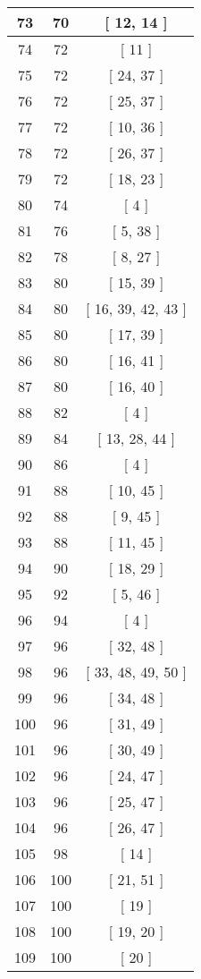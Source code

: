 \begin{center}
\begin{longtable}[H]{|| c c c ||}
73 & 70 & [ 12, 14 ] \\ 
\hline
74 & 72 & [ 11 ] \\ 
\hline
75 & 72 & [ 24, 37 ] \\ 
\hline
76 & 72 & [ 25, 37 ] \\ 
\hline
77 & 72 & [ 10, 36 ] \\ 
\hline
78 & 72 & [ 26, 37 ] \\ 
\hline
79 & 72 & [ 18, 23 ] \\ 
\hline
80 & 74 & [ 4 ] \\ 
\hline
81 & 76 & [ 5, 38 ] \\ 
\hline
82 & 78 & [ 8, 27 ] \\ 
\hline
83 & 80 & [ 15, 39 ] \\ 
\hline
84 & 80 & [ 16, 39, 42, 43 ] \\ 
\hline
85 & 80 & [ 17, 39 ] \\ 
\hline
86 & 80 & [ 16, 41 ] \\ 
\hline
87 & 80 & [ 16, 40 ] \\ 
\hline
88 & 82 & [ 4 ] \\ 
\hline
89 & 84 & [ 13, 28, 44 ] \\ 
\hline
90 & 86 & [ 4 ] \\ 
\hline
91 & 88 & [ 10, 45 ] \\ 
\hline
92 & 88 & [ 9, 45 ] \\ 
\hline
93 & 88 & [ 11, 45 ] \\ 
\hline
94 & 90 & [ 18, 29 ] \\ 
\hline
95 & 92 & [ 5, 46 ] \\ 
\hline
96 & 94 & [ 4 ] \\ 
\hline
97 & 96 & [ 32, 48 ] \\ 
\hline
98 & 96 & [ 33, 48, 49, 50 ] \\ 
\hline
99 & 96 & [ 34, 48 ] \\ 
\hline
100 & 96 & [ 31, 49 ] \\ 
\hline
101 & 96 & [ 30, 49 ] \\ 
\hline
102 & 96 & [ 24, 47 ] \\ 
\hline
103 & 96 & [ 25, 47 ] \\ 
\hline
104 & 96 & [ 26, 47 ] \\ 
\hline
105 & 98 & [ 14 ] \\ 
\hline
106 & 100 & [ 21, 51 ] \\ 
\hline
107 & 100 & [ 19 ] \\ 
\hline
108 & 100 & [ 19, 20 ] \\ 
\hline
109 & 100 & [ 20 ] \\ 

\end{longtable}
\end{center}
